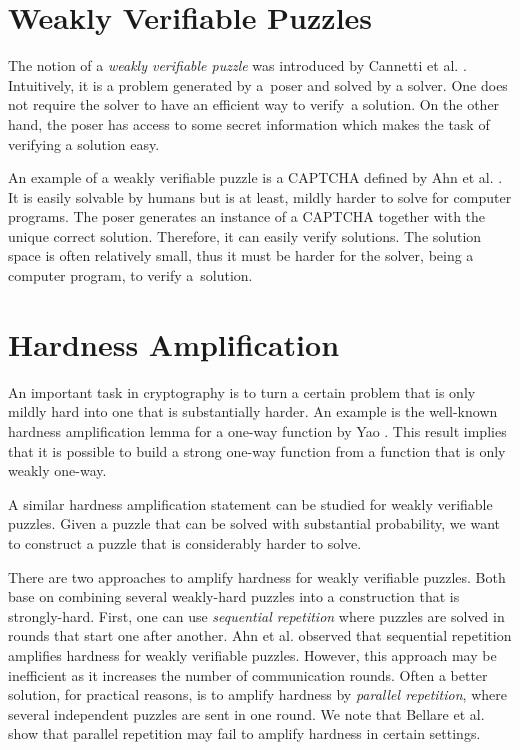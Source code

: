 \section{Weakly Verifiable Puzzles}
The notion of a \textit{weakly verifiable puzzle} was introduced by Cannetti et al. \cite{canetti2005hardness}.
Intuitively, it is a problem generated by a~poser and solved by a solver. One does not require the solver to have an efficient way to verify~a solution.
On the other hand, the poser has access to some secret information which makes the task of verifying a solution easy.

An example of a weakly verifiable puzzle is a CAPTCHA defined by Ahn et al. \cite{von2003captcha}.
It is easily solvable by humans but is at least, mildly harder to solve for computer programs.
The poser generates an instance of a CAPTCHA together with the unique correct solution.
Therefore, it can easily verify solutions.
The solution space is often relatively small,
thus it must be harder for the solver, being a computer program, to verify a~solution.

\section{Hardness Amplification}
An important task in cryptography is to turn a certain problem that is only mildly hard into one that is substantially harder.
An example is the well-known hardness amplification lemma for a one-way function by Yao \cite{yao1982theory}.
This result implies that it is possible to build a strong one-way function from a function that is only weakly one-way.

A similar hardness amplification statement can be studied for weakly verifiable puzzles.
Given a puzzle that can be solved with substantial probability, we want to construct a puzzle that is considerably harder to solve.

There are two approaches to amplify hardness for weakly verifiable puzzles.
Both base on combining several weakly-hard puzzles into a construction that is strongly-hard.
First, one can use \textit{sequential repetition} where puzzles are solved in rounds that start one after another.
Ahn et al. \cite{von2003captcha} observed that sequential repetition amplifies hardness for weakly verifiable puzzles.
However, this approach may be inefficient as it increases the number of communication rounds.
Often a better solution, for practical reasons, is to amplify hardness by \textit{parallel repetition},
where several independent puzzles are sent in one round.
We note that Bellare et al. \cite{bellare1997does} show that parallel repetition may fail to amplify hardness in certain settings.

